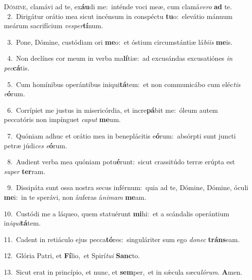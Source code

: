 \lettrine{\initial\textcolor{\initialcolor}{D}}{ómine,} clamávi ad te, ex\-\textbf{áu}\-di me:~\star inténde voci meæ, cum clamá\-\textit{ve}\-\textit{ro} \textbf{ad} te.\\
{\numbfont\textcolor{\numbcolor}{~2.}}~Dirigátur orátio mea sicut incénsum in conspéctu \textbf{tu}\-o:~\star elevátio mánuum meárum sacrifícium \textit{ves}\-\textit{per}\textbf{tí}num.\par
{\numbfont\textcolor{\numbcolor}{~3.}}~Pone, Dómine, custódiam ori \textbf{me}\-o:~\star et óstium circumstántiæ lá\-\textit{bi}\-\textit{is} \textbf{me}\-is.\par
{\numbfont\textcolor{\numbcolor}{~4.}}~Non declínes cor meum in verba ma\-\textbf{lí}\-tiæ:~\star ad excusándas excusatiónes \textit{in} \textit{pec}\-\textbf{cá}tis.\par
{\numbfont\textcolor{\numbcolor}{~5.}}~Cum homínibus operántibus iniqui\-\textbf{tá}\-tem:~\star et non communicábo cum eléc\textit{tis} \textit{e}\-\textbf{ó}rum.\par
{\numbfont\textcolor{\numbcolor}{~6.}}~Corrípiet me justus in misericórdia, et incre\-\textbf{pá}\-bit me:~\star óleum autem peccatóris non impínguet \textit{ca}\-\textit{put} \textbf{me}\-um.\par
{\numbfont\textcolor{\numbcolor}{~7.}}~Quóniam adhuc et orátio mea in beneplácitis e\-\textbf{ó}\-rum:~\star absórpti sunt juncti petræ júdi\textit{ces} \textit{e}\-\textbf{ó}rum.\par
{\numbfont\textcolor{\numbcolor}{~8.}}~Audient verba mea quóniam potu\-\textbf{é}\-runt:~\star sicut crassitúdo terræ erúpta est \textit{su}\-\textit{per} \textbf{ter}\-ram.\par
{\numbfont\textcolor{\numbcolor}{~9.}}~Dissipáta sunt ossa nostra secus inférnum:~\dagger quia ad te, Dómine, Dómine, óculi \textbf{me}\-i:~\star in te sperávi, non áuferas á\-\textit{ni}\-\textit{mam} \textbf{me}\-am.\par
{\numbfont\textcolor{\numbcolor}{10.}}~Custódi me a láqueo, quem statuérunt \textbf{mi}\-hi:~\star et a scándalis operántium in\-\textit{i}\-\textit{qui}\textbf{tá}tem.\par
{\numbfont\textcolor{\numbcolor}{11.}}~Cadent in retiáculo ejus pecca\-\textbf{tó}\-res:~\star singuláriter sum ego \textit{do}\-\textit{nec} \textbf{tráns}\-eam.\par
{\numbfont\textcolor{\numbcolor}{12.}}~Glória Patri, et \textbf{Fí}\-lio,~\star et Spirí\-\textit{tu}\-\textit{i} \textbf{Sanc}\-to.\par
{\numbfont\textcolor{\numbcolor}{13.}}~Sicut erat in princípio, et nunc, et \textbf{sem}\-per,~\star et in sǽcula sæcu\-\textit{ló}\-\textit{rum}. \textbf{A}\-men.\par
